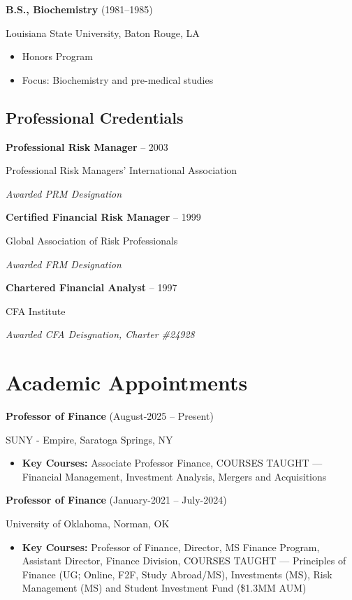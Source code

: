 \documentclass[11pt,a4paper,]{awesome-cv}
\begin{document}
\textbf{B.S., Biochemistry} (1981--1985)

Louisiana State University, Baton Rouge, LA

\begin{itemize}
\item Honors Program
\item Focus: Biochemistry and pre-medical studies
\end{itemize}

\newpage

\subsection{Professional Credentials}

\textbf{Professional Risk Manager} -- 2003

Professional Risk Managers' International Association

\textit{Awarded PRM Designation}

\textbf{Certified Financial Risk Manager} -- 1999

Global Association of Risk Professionals

\textit{Awarded FRM Designation}

\textbf{Chartered Financial Analyst} -- 1997

CFA Institute

\textit{Awarded CFA Deisgnation, Charter \#24928}

\section{Academic Appointments}\label{academic-appointments}

\textbf{Professor of Finance} (August-2025 -- Present)

SUNY - Empire, Saratoga Springs, NY

\begin{itemize}
\item \textbf{Key Courses:} Associate Professor Finance, COURSES TAUGHT --- Financial Management, Investment Analysis, Mergers and Acquisitions
\end{itemize}

\textbf{Professor of Finance} (January-2021 -- July-2024)

University of Oklahoma, Norman, OK

\begin{itemize}
\item \textbf{Key Courses:} Professor of Finance, Director, MS Finance Program, Assistant Director, Finance Division, COURSES TAUGHT --- Principles of Finance (UG; Online, F2F, Study Abroad/MS), Investments (MS), Risk Management (MS) and Student Investment Fund (\$1.3MM AUM)
\end{itemize}
\end{document}
